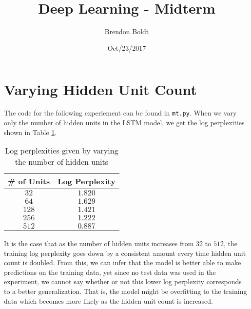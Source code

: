 \documentclass[a4paper]{article}
\title{Deep Learning - Midterm}
\author{Brendon Boldt}
\date{Oct/23/2017}
\begin{document}

\maketitle

%
\iffalse
\begin{lstlisting}
> python3 hw0.libraries.py
3.5.2 (default, Nov 17 2016, 17:05:23) 
[GCC 5.4.0 20160609]
1.13.1
0.19.1
0.19.0
2.0.2
0.20.3
1.3.0
\end{lstlisting}
\fi

\section{Varying Hidden Unit Count}

The code for the following experiement can be found in \texttt{mt.py}.
When we vary only the number of hidden units in the LSTM model,
we get the log perplexities shown in Table \ref{tbl-hidden-perp}.

\begin{table}[h]
 \caption{Log perplexities given by varying the number of hidden units}
 \label{tbl-hidden-perp}
 \begin{center}
  \begin{tabular}{cc}
    \hline \hline
    \# of Units & Log Perplexity \\
    \hline
    $32$  & $1.820$ \\
    $64$  & $1.629$ \\
    $128$ & $1.421$ \\
    $256$ & $1.222$ \\
    $512$ & $0.887$ \\
    \hline \hline
  \end{tabular}
 \end{center}
\end{table}

It is the case that as the number of hidden units increases from $32$
to $512$, the training log perplexity goes down by a consistent amount
every time hidden unit count is doubled. From this, we can infer that the
model is better able to make predictions on the training data, yet since
no test data was used in the experiment, we cannot say whether or not this
lower log perplexity corresponds to a better generalization. That is,
the model might be overfitting to the training data which becomes more
likely as the hidden unit count is increased.
\end{document}
